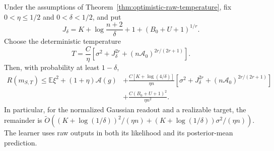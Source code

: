 \begin{corollary}
\label{cor:optimistic-raw-high-probability}
Under the assumptions of Theorem~\ref{thm:optimistic-raw-temperature}, fix $0<\eta\le1/2$ and $0<\delta<1/2$, and put
\[
 J_\delta=K+\log\frac{n+2}{\delta}+1+(B_0+U+1)^{1/r}.
\]
Choose the deterministic temperature
\[
 T=\frac C\eta\left[\sigma^2+J_\delta^{2r}
                      +(n\mathcal A_0)^{2r/(2r+1)}\right].
\]
Then, with probability at least $1-\delta$,
\begin{align*}
 R(m_{S,T})\le \mathbb E\xi^2+(1+\eta)\mathcal A(g)
 &+\frac{C[K+\log(4/\delta)]}{\eta n}
     \left[\sigma^2+J_\delta^{2r}
                      +(n\mathcal A_0)^{2r/(2r+1)}\right]\\
 &+\frac{C(B_0+U+1)^2}{\eta n^2}.
\end{align*}
In particular, for the normalized Gaussian readout and a realizable target, the remainder is
$\widetilde O((K+\log(1/\delta))^2/(\eta n)+(K+\log(1/\delta))\sigma^2/(\eta n))$.
The learner uses raw outputs in both its likelihood and its posterior-mean prediction.
\end{corollary}
